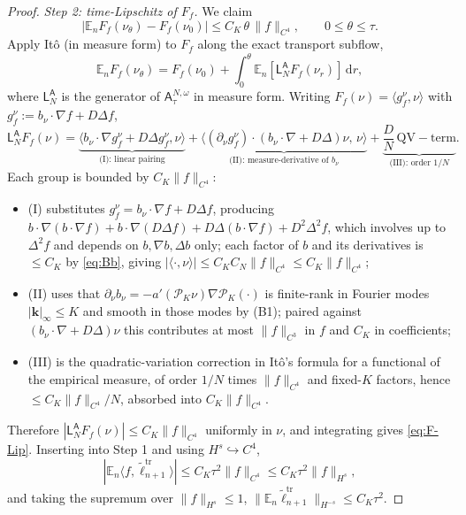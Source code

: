 \documentclass[a4paper,fleqn]{cas-sc}
\theoremstyle{definition}
\theoremstyle{remark}
\begin{document}
\begin{proof}
\emph{Step 2: time-Lipschitz of $F_f$.} We claim
\begin{equation}\label{eq:F-Lip}
|\mathbb E_nF_f(\nu_\theta)-F_f(\nu_0)|\le C_K\,\theta\,\|f\|_{C^4},
\qquad 0\le\theta\le\tau.
\end{equation}
Apply It\^o (in measure form) to $F_f$ along the exact transport subflow,
\[
\mathbb E_nF_f(\nu_\theta)=F_f(\nu_0)+\int_0^\theta\mathbb E_n[\mathsf L^{\mathsf A}_NF_f(\nu_r)]\,\mathrm dr,
\]
where $\mathsf L^{\mathsf A}_N$ is the generator of $\mathsf A^{N,\omega}_\tau$ in
measure form. Writing $F_f(\nu)=\langle g_f^\nu,\nu\rangle$ with
$g_f^\nu:=b_\nu\!\cdot\!\nabla f+D\Delta f$,
\[
\mathsf L^{\mathsf A}_N F_f(\nu)
=\underbrace{\langle b_\nu\!\cdot\!\nabla g_f^\nu+D\Delta g_f^\nu,\nu\rangle}_{\text{(I): linear pairing}}
+\underbrace{\bigl\langle(\partial_\nu g_f^\nu)\cdot(b_\nu\!\cdot\!\nabla\!+\!D\Delta)\nu,\,\nu\bigr\rangle}_{\text{(II): measure-derivative of }b_\nu}
+\underbrace{\frac{D}{N}\,\mathrm{QV-term}}_{\text{(III): order $1/N$}}.
\]
Each group is bounded by $C_K\|f\|_{C^4}$:
\begin{itemize}
\item (I) substitutes $g_f^\nu=b_\nu\!\cdot\!\nabla f+D\Delta f$, producing
$b\!\cdot\!\nabla(b\!\cdot\!\nabla f)+b\!\cdot\!\nabla(D\Delta f)+D\Delta(b\!\cdot\!\nabla f)+D^2\Delta^2f$,
which involves up to $\Delta^2f$ and depends on $b,\nabla b,\Delta b$ only;
each factor of $b$ and its derivatives is $\le C_K$ by \eqref{eq:Bb},
giving $|\langle\cdot,\nu\rangle|\le C_K C_N\|f\|_{C^4}\le C_K\|f\|_{C^4}$;
\item (II) uses that $\partial_\nu b_\nu=-a'(\mathcal P_K\nu)\nabla\mathcal P_K(\cdot)$
is finite-rank in Fourier modes $|\mathbf k|_\infty\le K$ and smooth in those modes
by (B1); paired against $(b_\nu\!\cdot\!\nabla+D\Delta)\nu$ this contributes at
most $\|f\|_{C^3}$ in $f$ and $C_K$ in coefficients;
\item (III) is the quadratic-variation correction in It\^o's formula for a
functional of the empirical measure, of order $1/N$ times $\|f\|_{C^4}$ and
fixed-$K$ factors, hence $\le C_K\|f\|_{C^4}/N$, absorbed into $C_K\|f\|_{C^4}$.
\end{itemize}
Therefore $|\mathsf L^{\mathsf A}_N F_f(\nu)|\le C_K\|f\|_{C^4}$ uniformly in
$\nu$, and integrating gives \eqref{eq:F-Lip}. Inserting into Step 1 and using
$H^s\hookrightarrow C^4$,
\[
|\mathbb E_n\langle f,\tilde\ell^{\mathrm{tr}}_{n+1}\rangle|\le C_K\tau^2\|f\|_{C^4}\le C_K\tau^2\|f\|_{H^s},
\]
and taking the supremum over $\|f\|_{H^s}\le1$,
$\|\mathbb E_n\tilde\ell^{\mathrm{tr}}_{n+1}\|_{H^{-s}}\le C_K\tau^2$.


\end{proof}
\end{document}
